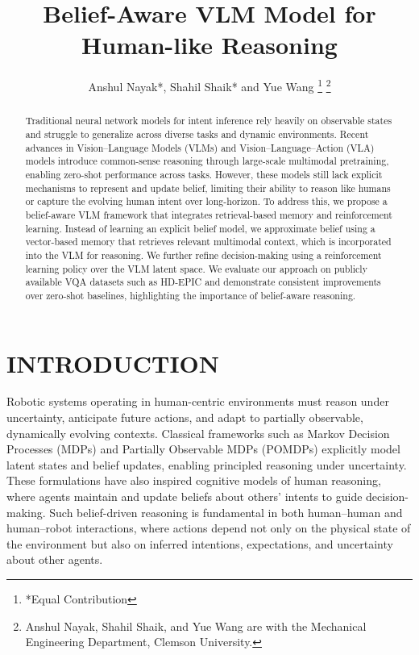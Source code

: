 \documentclass[letterpaper, 10 pt, conference]{ieeeconf}  %
\title{\LARGE \bf
Belief-Aware VLM Model for Human-like Reasoning 
}
\author{Anshul Nayak*, Shahil Shaik* and Yue Wang%
\thanks{*Equal Contribution}%
\thanks{ Anshul Nayak, Shahil Shaik, and Yue Wang are with the Mechanical Engineering
    Department, Clemson University.}%
%
}
\begin{document}
\maketitle
\thispagestyle{empty}
\pagestyle{empty}


\begin{abstract}

Traditional neural network models for intent inference rely heavily on observable states and struggle to generalize across diverse tasks and dynamic environments. Recent advances in Vision–Language Models (VLMs) and Vision–Language–Action (VLA) models introduce common-sense reasoning through large-scale multimodal pretraining, enabling zero-shot performance across tasks. However, these models still lack explicit mechanisms to represent and update belief, limiting their ability to reason like humans  or capture the  evolving human intent over long-horizon. To address this, we propose a belief-aware VLM framework that integrates retrieval-based memory and reinforcement learning. Instead of learning an explicit belief model, we approximate belief using a vector-based memory that retrieves relevant multimodal context, which is incorporated into the VLM for reasoning. We further refine decision-making using a reinforcement learning policy over the VLM latent space. We evaluate our approach on publicly available VQA datasets such as HD-EPIC and demonstrate consistent improvements over zero-shot baselines, highlighting the importance of belief-aware reasoning.

\end{abstract}


\section{INTRODUCTION}



Robotic systems operating in human-centric environments must reason under uncertainty, anticipate future actions, and adapt to partially observable, dynamically evolving contexts. Classical frameworks such as Markov Decision Processes (MDPs) and Partially Observable MDPs (POMDPs) explicitly model latent states and belief updates, enabling principled reasoning under uncertainty. These formulations have also inspired cognitive models of human reasoning, where agents maintain and update beliefs about others’ intents to guide decision-making. Such belief-driven reasoning is fundamental in both human–human and human–robot interactions, where actions depend not only on the physical state of the environment but also on inferred intentions, expectations, and uncertainty about other agents.
\end{document}
